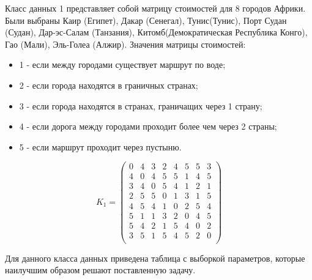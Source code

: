 Класс данных 1 представляет собой матрицу стоимостей для 8 городов Африки. Были выбраны Каир (Египет), Дакар (Сенегал), Тунис(Тунис), Порт Судан (Судан), Дар-эс-Салам (Танзания), Китомб(Демократическая Республика Конго), Гао (Мали), Эль-Голеа (Алжир). Значения матрицы стоимостей:
\begin{itemize}
	\item 1 - если между городами существует маршрут по воде;
	\item 2 - если города находятся в граничных странах;
	\item 3 - если города находятся в странах, граничащих через 1 страну;
	\item 4 - если дорога между городами проходит более чем через 2 страны;
	\item 5 - если маршрут проходит через пустыню.
\end{itemize}

\begin{equation}
    \label{eq:kd1}
	K_{1} = \begin{pmatrix}
		0 & 4 & 3 & 2 & 4 & 5 & 5 & 3 \\
		4 & 0 & 4 & 5 & 5 & 1 & 4 & 5 \\
		3 & 4 & 0 & 5 & 4 & 1 & 2 & 1 \\
		2 & 5 & 5 & 0 & 1 & 3 & 1 & 5 \\
		4 & 5 & 4 & 1 & 0 & 2 & 5 & 4 \\
		5 & 1 & 1 & 3 & 2 & 0 & 4 & 5 \\
		5 & 4 & 2 & 1 & 5 & 4 & 0 & 2 \\
		3 & 5 & 1 & 5 & 4 & 5 & 2 & 0 \\
	\end{pmatrix}
\end{equation}

Для данного класса данных приведена таблица с выборкой параметров, которые наилучшим образом решают поставленную задачу.

